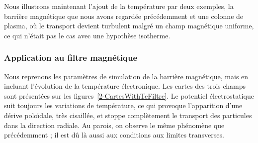 \begin{refsection}
Nous illustrons maintenant l'ajout de la température par deux exemples, la
barrière magnétique que nous avons regardée précédemment et une colonne de
plasma, où le transport devient turbulent malgré un champ magnétique uniforme, ce qui
n'était pas le cas avec une hypothèse isotherme.

	\subsubsection{Application au filtre magnétique}

Nous reprenons les paramètres de simulation de la barrière magnétique, mais en
incluant l'évolution de la température électronique. Les cartes des trois champs
sont présentées sur les figures~\ref{2-CartesWithTeFiltre}. Le
potentiel électrostatique suit toujours les variations de température, ce qui
provoque l'apparition d'une dérive poloïdale, très cisaillée, et stoppe complètement le
transport des particules dans la direction radiale. Au parois, on observe le
même phénomène que précédemment ; il est dû là aussi aux conditions aux limites
transverses.
	\begin{figure}[!htbp]
    \centering

\end{figure}
\end{refsection}
